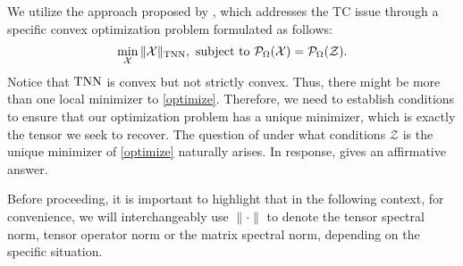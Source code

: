 \documentclass[twoside,12pt]{article}
\newcommand{\TNN}{\textnormal{TNN}}
\begin{document}
We utilize the approach proposed by \cite{%
zhang2017exact}, which addresses the TC issue through a specific convex optimization problem formulated as follows: 
\begin{equation}\label{optimize}
\begin{gathered}
\min_{\mathcal{X}}\|\mathcal{X}\|_{\TNN}, 
\text { subject to } \mathcal{P}_{\Omega}(\mathcal{X})=\mathcal{P}_{\Omega}(\mathcal{Z}).
\end{gathered}
\end{equation}
Notice that $\TNN$ is convex but not strictly convex. Thus, there might be more than one local minimizer to   \eqref{optimize}. Therefore, we need to establish conditions to ensure that our optimization problem has a unique minimizer, which is exactly the tensor we seek to recover. The question of under what conditions $\mathcal{Z}$  is the unique minimizer of  \eqref{optimize}  naturally arises. In response,  gives an affirmative answer. 

Before proceeding, it is important to highlight that in the following context, for convenience, we will interchangeably use $\|\cdot\|$ to denote the tensor spectral norm, %
tensor operator norm or the matrix spectral norm, depending on the specific situation.
\end{document}
